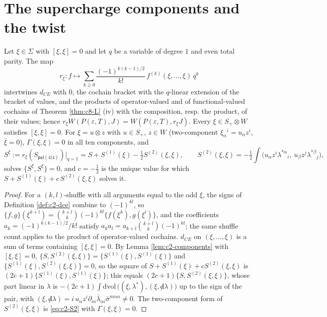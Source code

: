 \section{The supercharge components and the twist}

\begin{lemma}
\label{lem:c8-ev}
Let $\xi\in\Sigma$ with $[\xi,\xi]=0$ and let $q$ be a variable of degree $1$ and even total parity. The map
\[
r_\xi\colon f\mapsto\sum_{k\ge0}\frac{(-1)^{k(k-1)/2}}{k!}\,f^{(k)}(\xi,\dots,\xi)\,q^k
\]
intertwines $d_{CE}$ with $0$, the cochain bracket with the $q$-linear extension of the bracket of values, and the products of operator-valued and of functional-valued cochains of Theorem \ref{thm:c8-L} (iv) with the composition, resp. the product, of their values; hence $r_\xi W(P(\varepsilon,T),J)=W(P(\varepsilon,T),r_\xi J)$. Every $\xi\in S_+\otimes W$ satisfies $[\xi,\xi]=0$. For $\xi=u\otimes z$ with $u\in S_+$, $z\in W$ (two-component $\xi_\alpha{}^i=u_\alpha z^i$, $\bar\xi=0$), $\Gamma(\xi,\xi)=0$ in all ten components, and
\begin{equation}
S^\xi:=r_\xi(S_{\mathfrak{psl}(4|4)})\big|_{q=1}=S+S^{(1)}(\xi)-\tfrac12S^{(2)}(\xi,\xi),\qquad S^{(2)}(\xi,\xi)=-\tfrac12\int\big(u_\alpha z^i\lambda^{*\alpha}{}_i,\ u_\beta z^j\lambda^{*\beta}{}_j\big),
\label{eq:c8-twistaction}
\end{equation}
solves $\{S^\xi,S^\xi\}=0$, and $c=-\tfrac12$ is the unique value for which $S+S^{(1)}(\xi)+c\,S^{(2)}(\xi,\xi)$ solves it.
\end{lemma}

\begin{proof}
For a $(k,l)$-shuffle with all arguments equal to the odd $\xi$, the signs of Definition \ref{def:c2-dce} combine to $(-1)^{kl}$, so $\{f,g\}(\xi^{k+l})=\binom{k+l}{k}(-1)^{kl}\{f(\xi^k),g(\xi^l)\}$, and the coefficients $a_k=(-1)^{k(k-1)/2}/k!$ satisfy $a_ka_l=a_{k+l}\binom{k+l}{k}(-1)^{kl}$; the same shuffle count applies to the product of operator-valued cochains. $d_{CE}$ on $(\xi,\dots,\xi)$ is a sum of terms containing $[\xi,\xi]=0$. By Lemma \ref{lem:c2-components} with $[\xi,\xi]=0$, $\{S,S^{(2)}(\xi,\xi)\}=\{S^{(1)}(\xi),S^{(1)}(\xi)\}$ and $\{S^{(1)}(\xi),S^{(2)}(\xi,\xi)\}=0$, so the square of $S+S^{(1)}(\xi)+cS^{(2)}(\xi,\xi)$ is $(2c+1)\{S^{(1)}(\xi),S^{(1)}(\xi)\}$; this equals $(2c+1)\{S,S^{(2)}(\xi,\xi)\}$, whose part linear in $\lambda$ is $-(2c+1)\int\mathrm{dvol}\,\big((\xi,\lambda^*),(\xi,{\not d}\lambda)\big)$ up to the sign of the pair, with $(\xi,{\not d}\lambda)=i\,u_\alpha z^i\partial_m\bar\lambda_{\dot\alpha i}\bar\sigma^{m\dot\alpha\alpha}\neq0$. The two-component form of $S^{(2)}(\xi,\xi)$ is \eqref{eq:c2-S2} with $\Gamma(\xi,\xi)=0$.
\end{proof}

